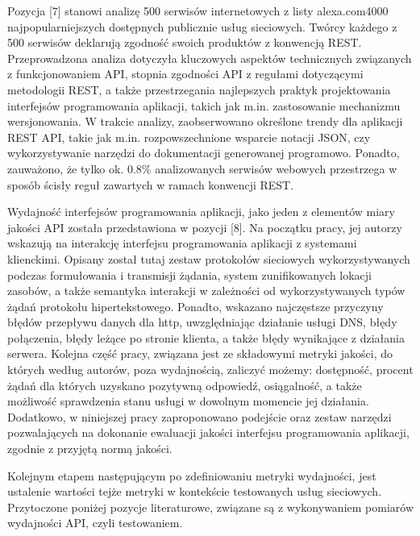 Pozycja [7] stanowi analizę 500 serwisów internetowych z listy alexa.com4000 najpopularniejszych dostępnych publicznie usług sieciowych. Twórcy każdego z 500 serwisów deklarują zgodność swoich produktów z konwencją REST. Przeprowadzona analiza dotyczyła kluczowych aspektów technicznych związanych z funkcjonowaniem API, stopnia zgodności API z regułami dotyczącymi metodologii REST, a także przestrzegania najlepszych praktyk projektowania interfejsów programowania aplikacji, takich jak m.in. zastosowanie mechanizmu wersjonowania. W trakcie analizy, zaobserwowano określone trendy dla aplikacji REST API, takie jak m.in. rozpowszechnione wsparcie notacji JSON, czy wykorzystywanie narzędzi do dokumentacji generowanej programowo. Ponadto, zauważono, że tylko ok. 0.8\% analizowanych serwisów webowych przestrzega w sposób ścisły reguł zawartych w ramach konwencji REST.

Wydajność interfejsów programowania aplikacji, jako jeden z elementów miary jakości API została przedstawiona w pozycji [8]. Na początku pracy, jej autorzy wskazują na interakcję interfejsu programowania aplikacji z systemami klienckimi. Opisany został tutaj zestaw protokołów sieciowych wykorzystywanych podczas formułowania i transmisji żądania, system zunifikowanych lokacji zasobów, a także semantyka interakcji w zależności od wykorzystywanych typów żądań protokołu hipertekstowego. Ponadto, wskazano najczęstsze przyczyny błędów przepływu danych dla http, uwzględniając działanie usługi DNS, błędy połączenia, błędy leżące po stronie klienta, a także błędy wynikające z działania serwera. Kolejna część pracy, związana jest ze składowymi metryki jakości, do których według autorów, poza wydajnością, zaliczyć możemy: dostępność, procent żądań dla których uzyskano pozytywną odpowiedź, osiągalność, a także możliwość sprawdzenia stanu usługi w dowolnym momencie jej działania. Dodatkowo, w niniejszej pracy zaproponowano podejście oraz zestaw narzędzi pozwalających na dokonanie ewaluacji jakości interfejsu programowania aplikacji, zgodnie z przyjętą normą jakości.

Kolejnym etapem następującym po zdefiniowaniu metryki wydajności, jest ustalenie wartości tejże metryki w kontekście testowanych usług sieciowych. Przytoczone poniżej pozycje literaturowe, związane są z wykonywaniem pomiarów wydajności API, czyli testowaniem.

